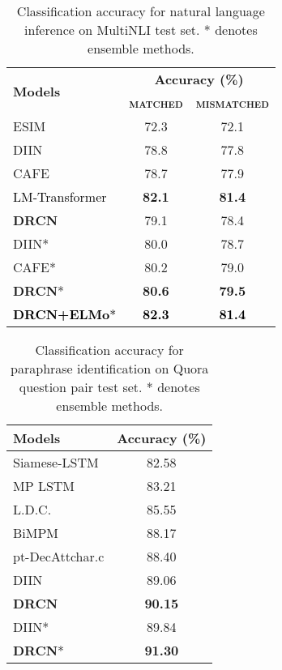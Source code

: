 \documentclass[letterpaper]{article} \usepackage{aaai19}  \usepackage{times}  \usepackage{helvet}  \usepackage{courier}  \usepackage{url}  \usepackage{graphicx}  \frenchspacing  \setlength{\pdfpagewidth}{8.5in}  \setlength{\pdfpageheight}{11in}
\newcommand\shh[1]{\textcolor{black}{#1}}
\begin{document}
\begin{table}[t]
\centering
\resizebox{\linewidth}{!}
{
\begin{tabular}{lcc}\hline
	\multirow{2}{*}{\textbf{Models}} & \multicolumn{2}{c}{\textbf{Accuracy (\%)}} \\
	 & \textbf{\textsc{matched}} & \textbf{\textsc{mismatched}} \\
	\hline
    ESIM \cite{williams2017broad} &	72.3 &	72.1 \\
	DIIN \cite{gong2018natural} &	78.8 & 77.8 \\
	CAFE \cite{tay2017compare} &	78.7 & 77.9 \\
	\shh{LM-Transformer \cite{radford2018improving}} & \textbf{82.1} &	\textbf{81.4} \\
	\textbf{DRCN} & 79.1 &	78.4 \\
  	\hline
	DIIN* \cite{gong2018natural} &	80.0 &	78.7 \\
	CAFE* \cite{tay2017compare} & 80.2	  &	 79.0 \\
	\textbf{DRCN}* &	\textbf{80.6}  &	\textbf{79.5} \\
	\shh{\textbf{DRCN+ELMo}*} &	\shh{\textbf{82.3}}  &\shh{\textbf{81.4}} \\
   	\hline
\end{tabular}
}
\caption{Classification accuracy for natural language inference on MultiNLI test set. * denotes ensemble methods.}
\label{tab:exp_mnli}
\end{table}


\begin{table}[t]
\centering
\resizebox{\linewidth}{!}
{
\begin{tabular}{lc}\hline
	\textbf{Models} & \textbf{Accuracy (\%)}  \\
	\hline
Siamese-LSTM \cite{wang2017bilateral} & 82.58  \\
    MP LSTM \cite{wang2017bilateral} & 83.21  \\
    L.D.C. \cite{wang2017bilateral} & 85.55  \\
    BiMPM \cite{wang2017bilateral} & 88.17  \\
    pt-DecAttchar.c \cite{tomar2017neural} & 88.40  \\
    DIIN \cite{gong2018natural} & 89.06  \\
    \textbf{DRCN} & \textbf{90.15}  \\
	\hline
    DIIN* \cite{gong2018natural} & 89.84  \\
    \textbf{DRCN}* & \textbf{91.30}  \\
   	\hline
\end{tabular}
}
\caption{Classification accuracy for paraphrase identification on Quora question pair test set. * denotes ensemble methods.}
\label{tab:exp_quora}
\end{table}
\end{document}
